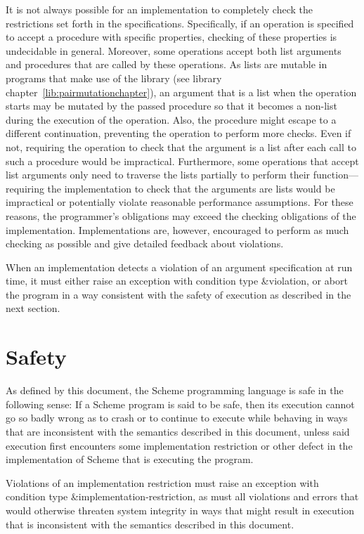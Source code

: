 It is not always possible for an implementation to completely check
the restrictions set forth in the specifications.  Specifically, if an
operation is specified to accept a procedure with specific properties,
checking of these properties is undecidable in general.  Moreover,
some operations accept both list arguments and procedures that are
called by these operations.  As lists are mutable in programs that
make use of the  library (see library
chapter~\ref{lib:pairmutationchapter}), an argument that is a list
when the operation starts may be mutated by the passed procedure so
that it becomes a non-list during the execution of the operation.
Also, the procedure might escape to a different continuation,
preventing the operation to perform more checks.
Even if not, requiring the operation to check that the argument is a list after
each call to such a procedure would be impractical.  Furthermore, some
operations that accept list arguments only need to traverse the lists
partially to perform their function---requiring the implementation to
check that the arguments are lists would be impractical or potentially
violate reasonable performance assumptions.  For these reasons, the
programmer's obligations may exceed the checking obligations of the
implementation.  Implementations are, however, encouraged to perform
as much checking as possible and give detailed feedback about
violations.

When an implementation detects a violation of an argument
specification at run time, it must either raise an exception with
condition type {\cf\&violation}, or abort the program in a way
consistent with the safety of execution as described in the next
section.

\section{Safety}
\label{safeunsafemodesection}

As defined by this document, the Scheme programming language
is safe in the following sense:
If a Scheme program is said to be safe, then its execution
cannot go so badly wrong as to crash or to continue to
execute while behaving in ways that are
inconsistent with the semantics described in this document,
unless said execution first encounters some implementation
restriction or other defect in the implementation of Scheme
that is executing the program.

Violations of an implementation restriction must raise an
exception with condition type {\cf\&implementation-restriction},
as must all
violations and errors that would otherwise threaten system
integrity in ways that might result in execution that is
inconsistent with the semantics described in this document.

